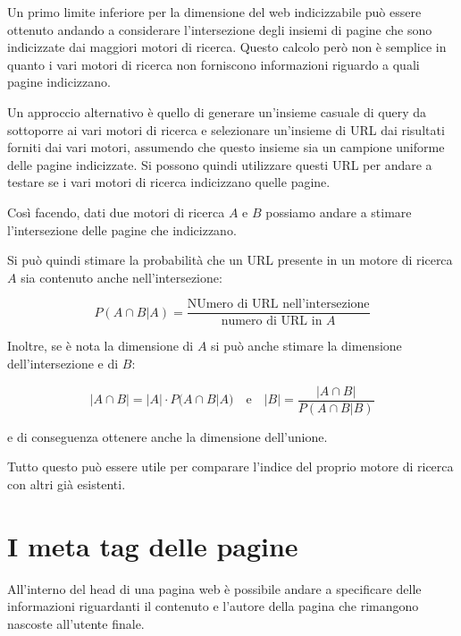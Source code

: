 

Un primo limite inferiore per la dimensione del web indicizzabile può essere ottenuto andando a considerare l'intersezione degli insiemi di pagine che sono indicizzate dai maggiori motori di ricerca.
Questo calcolo però non è semplice in quanto i vari motori di ricerca non forniscono informazioni riguardo a quali pagine indicizzano.

Un approccio alternativo è quello di generare un'insieme casuale di query da sottoporre ai vari motori di ricerca e selezionare un'insieme di URL dai risultati forniti dai vari motori, assumendo che questo insieme sia un campione uniforme delle pagine indicizzate.
Si possono quindi utilizzare questi URL per andare a testare se i vari motori di ricerca indicizzano quelle pagine.

Così facendo, dati due motori di ricerca $A$ e $B$ possiamo andare a stimare l'intersezione delle pagine che indicizzano.

Si può quindi stimare la probabilità che un URL presente in un motore di ricerca $A$ sia contenuto anche nell'intersezione:

$$
P(A \cap B | A) = \frac{\text{NUmero di URL nell'intersezione}}{\text{numero di URL in }A}
$$

Inoltre, se è nota la dimensione di $A$ si può anche stimare la dimensione dell'intersezione e di $B$:

$$
|A \cap B| = |A| \cdot P(A \cap B | A) \quad \text{e} \quad |B| = \frac{|A \cap B|}{P(A \cap B | B)}
$$

e di conseguenza ottenere anche la dimensione dell'unione.

Tutto questo può essere utile per comparare l'indice del proprio motore di ricerca con altri già esistenti.


\section{I meta tag delle pagine}

All'interno del head di una pagina web è possibile andare a specificare delle informazioni riguardanti il contenuto e l'autore della pagina che rimangono nascoste all'utente finale.

